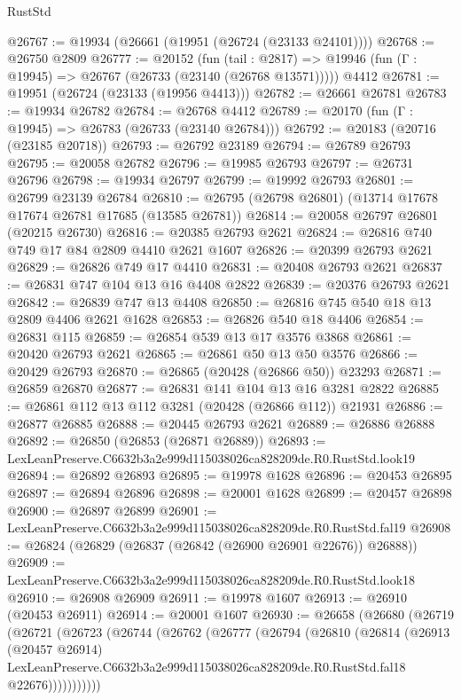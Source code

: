 \begin{lexlean}{RustStd}
\begin{coremodule}
@26767 := @19934 (@26661 (@19951 (@26724 (@23133 @24101))))
@26768 := @26750 @2809
@26777 := @20152
    (fun (tail : @2817) => @19946 (fun (Γ : @19945) => @26767 (@26733 (@23140 (@26768 @13571)))))
    @4412
@26781 := @19951 (@26724 (@23133 (@19956 @4413)))
@26782 := @26661 @26781
@26783 := @19934 @26782
@26784 := @26768 @4412
@26789 := @20170 (fun (Γ : @19945) => @26783 (@26733 (@23140 @26784)))
@26792 := @20183 (@20716 (@23185 @20718))
@26793 := @26792 @23189
@26794 := @26789 @26793
@26795 := @20058 @26782
@26796 := @19985 @26793
@26797 := @26731 @26796
@26798 := @19934 @26797
@26799 := @19992 @26793
@26801 := @26799 @23139 @26784
@26810 := @26795 (@26798 @26801) (@13714 @17678 @17674 @26781 @17685 (@13585 @26781))
@26814 := @20058 @26797 @26801 (@20215 @26730)
@26816 := @20385 @26793 @2621
@26824 := @26816 @740 @749 @17 @84 @2809 @4410 @2621 @1607
@26826 := @20399 @26793 @2621
@26829 := @26826 @749 @17 @4410
@26831 := @20408 @26793 @2621
@26837 := @26831 @747 @104 @13 @16 @4408 @2822
@26839 := @20376 @26793 @2621
@26842 := @26839 @747 @13 @4408
@26850 := @26816 @745 @540 @18 @13 @2809 @4406 @2621 @1628
@26853 := @26826 @540 @18 @4406
@26854 := @26831 @115
@26859 := @26854 @539 @13 @17 @3576 @3868
@26861 := @20420 @26793 @2621
@26865 := @26861 @50 @13 @50 @3576
@26866 := @20429 @26793
@26870 := @26865 (@20428 (@26866 @50)) @23293
@26871 := @26859 @26870
@26877 := @26831 @141 @104 @13 @16 @3281 @2822
@26885 := @26861 @112 @13 @112 @3281 (@20428 (@26866 @112)) @21931
@26886 := @26877 @26885
@26888 := @20445 @26793 @2621
@26889 := @26886 @26888
@26892 := @26850 (@26853 (@26871 @26889))
@26893 := LexLeanPreserve.C6632b3a2e999d115038026ca828209de.R0.RustStd.look19
@26894 := @26892 @26893
@26895 := @19978 @1628
@26896 := @20453 @26895
@26897 := @26894 @26896
@26898 := @20001 @1628
@26899 := @20457 @26898
@26900 := @26897 @26899
@26901 := LexLeanPreserve.C6632b3a2e999d115038026ca828209de.R0.RustStd.fal19
@26908 := @26824 (@26829 (@26837 (@26842 (@26900 @26901 @22676)) @26888))
@26909 := LexLeanPreserve.C6632b3a2e999d115038026ca828209de.R0.RustStd.look18
@26910 := @26908 @26909
@26911 := @19978 @1607
@26913 := @26910 (@20453 @26911)
@26914 := @20001 @1607
@26930 := @26658
    (@26680
      (@26719
        (@26721
          (@26723
            (@26744
              (@26762
                (@26777
                  (@26794
                    (@26810
                      (@26814
                        (@26913
                          (@20457 @26914)
                          LexLeanPreserve.C6632b3a2e999d115038026ca828209de.R0.RustStd.fal18
                          @22676)))))))))))

\end{coremodule}
\end{lexlean}
